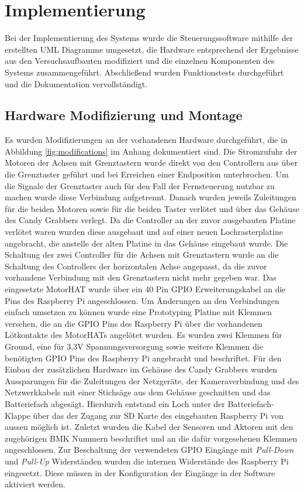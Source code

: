 \documentclass[BMR,Bachelor,ngerman]{twbook}%
\begin{document}
\section{Implementierung}
Bei der Implementierung des Systems wurde die Steuerungssoftware mithilfe der erstellten UML Diagramme umgesetzt, die Hardware entsprechend der Ergebnisse aus den Versuchsaufbauten modifiziert und die einzelnen Komponenten des Systems zusammengeführt. Abschließend wurden Funktionstests durchgeführt und die Dokumentation vervollständigt.
\subsection{Hardware Modifizierung und Montage}
Es wurden Modifizierungen an der vorhandenen Hardware durchgeführt, die in Abbildung \ref{fig:modifications} im Anhang dokumentiert sind. Die Stromzufuhr der Motoren der Achsen mit Grenztastern wurde direkt von den Controllern aus über die Grenztaster geführt und bei Erreichen einer Endposition unterbrochen. Um die Signale der Grenztaster auch für den Fall der Fernsteuerung nutzbar zu machen wurde diese Verbindung aufgetrennt. Danach wurden jeweils Zuleitungen für die beiden Motoren sowie für die beiden Taster verlötet und über das Gehäuse des Candy Grabbers verlegt. Da die Controller an der zuvor ausgebauten Platine verlötet waren wurden diese ausgebaut und auf einer neuen Lochrasterplatine angebracht, die anstelle der alten Platine in das Gehäuse eingebaut wurde. Die Schaltung der zwei Controller für die Achsen mit Grenztastern wurde an die Schaltung des Controllers der horizontalen Achse angepasst, da die zuvor vorhandene Verbindung mit den Grenztastern nicht mehr gegeben war. Das eingesetzte MotorHAT wurde über ein 40 Pin \ac{GPIO} Erweiterungskabel an die Pins des Raspberry Pi angeschlossen. Um Änderungen an den Verbindungen einfach umsetzen zu können wurde eine Prototyping Platine mit Klemmen versehen, die an die GPIO Pins des Raspberry Pi über die vorhandenen Lötkontakte des MotorHATs angelötet wurden. Es wurden zwei Klemmen für Ground, eine für 3,3V Spannungsversorgung sowie weitere Klemmen die benötigten \ac{GPIO} Pins des Raspberry Pi angebracht und beschriftet. Für den Einbau der zusätzlichen Hardware im Gehäuse des Candy Grabbers wurden Aussparungen für die Zuleitungen der Netzgeräte, der Kameraverbindung und des Netzwerkkabels mit einer Stichsäge aus dem Gehäuse geschnitten und das Batteriefach abgesägt. Hierdurch entstand ein Loch unter der Batteriefach-Klappe über das der Zugang zur SD Karte des eingebauten Raspberry Pi von aussen möglich ist. Zuletzt wurden die Kabel der Sensoren und Aktoren mit den zugehörigen BMK Nummern beschriftet und an die dafür vorgesehenen Klemmen angeschlossen. Zur Beschaltung der verwendeten \ac{GPIO} Eingänge mit \emph{Pull-Down} und \emph{Pull-Up} Widerständen wurden die internen Widerstände des Raspberry Pi eingesetzt. Diese müssen in der Konfiguration der Eingänge in der Software aktiviert werden.
\end{document}

